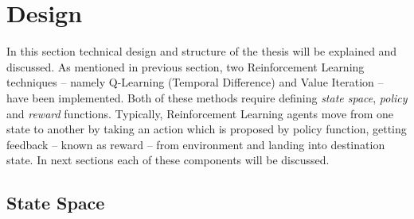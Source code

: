 \clearpage
\section{Design}
\label{des:proj}

In this section technical design and structure of the thesis will be explained and discussed. As mentioned in previous section, two Reinforcement Learning techniques -- namely Q-Learning (Temporal Difference) and Value Iteration -- have been implemented. Both of these methods require defining \emph{state space}, \emph{policy} and \emph{reward} functions. Typically, Reinforcement Learning agents move from one state to another by taking an action which is proposed by policy function, getting feedback -- known as reward -- from environment and landing into destination state. In next sections each of these components will be discussed.

\subsection{State Space}
\label{des:state-space}

